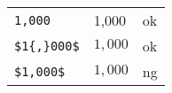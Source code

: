 \documentclass[preview]{standalone}
\newcommand{\tA}[1]{\textcolor{cA}{#1}}
\newcommand{\tD}[1]{\textcolor{cD}{#1}}
\begin{document}
\begin{table}[H]
    \centering
    \begin{tabular}{lll}
        \verb|1,000|     & 1,000     & \tA{ok} \\
        \verb|$1{,}000$| & $1{,}000$ & \tA{ok} \\
        \verb|$1,000$|   & $1,000$   & \tD{ng} \\
    \end{tabular}
\end{table}
\end{document}
